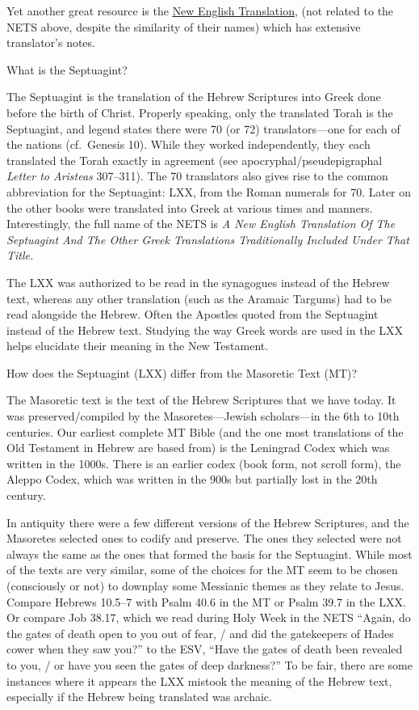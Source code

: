 \documentclass[
]{article}
\begin{document}
Yet another great resource is the \href{https://netbible.org/}{\ul{New
English Translation}}, (not related to the NETS above, despite the
similarity of their names) which has extensive translator's notes.

What is the Septuagint?

The Septuagint is the translation of the Hebrew Scriptures into Greek
done before the birth of Christ. Properly speaking, only the translated
Torah is the Septuagint, and legend states there were 70 (or 72)
translators---one for each of the nations (cf.~Genesis 10). While they
worked independently, they each translated the Torah exactly in
agreement (see apocryphal/pseudepigraphal \emph{Letter to Aristeas}
307--311). The 70 translators also gives rise to the common abbreviation
for the Septuagint: LXX, from the Roman numerals for 70. Later on the
other books were translated into Greek at various times and manners.
Interestingly, the full name of the NETS is \emph{A New English
Translation Of The Septuagint And The Other Greek Translations
Traditionally Included Under That Title.}

The LXX was authorized to be read in the synagogues instead of the
Hebrew text, whereas any other translation (such as the Aramaic Targums)
had to be read alongside the Hebrew. Often the Apostles quoted from the
Septuagint instead of the Hebrew text. Studying the way Greek words are
used in the LXX helps elucidate their meaning in the New Testament.

How does the Septuagint (LXX) differ from the Masoretic Text (MT)?

The Masoretic text is the text of the Hebrew Scriptures that we have
today. It was preserved/compiled by the Masoretes---Jewish scholars---in
the 6th to 10th centuries. Our earliest complete MT Bible (and the one
most translations of the Old Testament in Hebrew are based from) is the
Leningrad Codex which was written in the 1000s. There is an earlier
codex (book form, not scroll form), the Aleppo Codex, which was written
in the 900s but partially lost in the 20th century.

In antiquity there were a few different versions of the Hebrew
Scriptures, and the Masoretes selected ones to codify and preserve. The
ones they selected were not always the same as the ones that formed the
basis for the Septuagint. While most of the texts are very similar, some
of the choices for the MT seem to be chosen (consciously or not) to
downplay some Messianic themes as they relate to Jesus. Compare Hebrews
10.5--7 with Psalm 40.6 in the MT or Psalm 39.7 in the LXX. Or compare
Job 38.17, which we read during Holy Week in the NETS ``Again, do the
gates of death open to you out of fear, / and did the gatekeepers of
Hades cower when they saw you?'' to the ESV, ``Have the gates of death
been revealed to you, / or have you seen the gates of deep darkness?''
To be fair, there are some instances where it appears the LXX mistook
the meaning of the Hebrew text, especially if the Hebrew being
translated was archaic.
\end{document}
